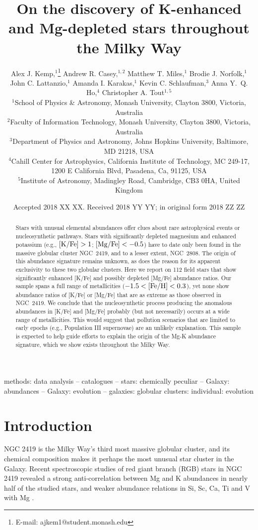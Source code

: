 \documentclass[a4paper,fleqn,usenatbib]{mnras}
\title[Mg-K stars in LAMOST]{On the discovery of K-enhanced and Mg-depleted stars throughout the Milky Way}
\author[Kemp et al.]{Alex J. Kemp,$^{1}$\thanks{E-mail: ajkem1@student.monash.edu}
Andrew R. Casey,$^{1,2}$
Matthew T. Miles,$^{1}$
Brodie J. Norfolk,$^{1}$\newauthor
John C. Lattanzio,$^{1}$
Amanda I. Karakas,$^{1}$
Kevin C. Schlaufman,$^{3}$
Anna Y.~Q. Ho,$^{4}$\newauthor
Christopher A. Tout$^{1,5}$
\\
$^{1}$School of Physics \& Astronomy, Monash University, Clayton 3800, Victoria, Australia\\
$^{2}$Faculty of Information Technology, Monash University, Clayton 3800, Victoria, Australia\\
$^{3}$Department of Physics and Astronomy, Johns Hopkins University, Baltimore, MD 21218, USA\\
$^{4}$Cahill Center for Astrophysics, California Institute of Technology, MC 249-17, 1200 E California Blvd, Pasadena, Ca, 91125, USA\\
$^{5}$Institute of Astronomy, Madingley Road, Cambridge, CB3 0HA, United Kingdom\\
}
\date{Accepted 2018 XX XX. Received 2018 YY YY; in original form 2018 ZZ ZZ}
\begin{document}
\label{firstpage}
\pagerange{\pageref{firstpage}--\pageref{lastpage}}
\maketitle


\begin{abstract}
Stars with unusual elemental abundances offer clues about rare astrophysical events or nucleosynthetic pathways. Stars with significantly depleted magnesium and enhanced potassium (e.g., $[{\rm K}/{\rm Fe}] > 1$; $[{\rm Mg}/{\rm Fe}] < -0.5$) have to date only been found in the massive globular cluster NGC~2419, and to a lesser extent, NGC~2808. The origin of this abundance signature remains unknown, as does the reason for its apparent exclusivity to these two globular clusters. Here we report on 112 field stars that show significantly enhanced [K/Fe] and possibly depleted [Mg/Fe] abundance ratios.
Our sample spans a full range of metallicities ($-1.5 < [{\rm Fe}/{\rm H}] < 0.3$), yet none show abundance ratios of [K/Fe] or [Mg/Fe] that are as extreme as those observed in NGC~2419. 
We conclude that the nucleosynthetic process producing the anomalous abundances in [K/Fe] and [Mg/Fe] probably (but not necessarily) occurs at a wide range of metallicities. This would suggest that pollution scenarios that are limited to early epochs (e.g., Population III supernovae) are an unlikely explanation. This sample is expected to help guide efforts to explain the origin of the Mg-K abundance signature, which we show exists throughout the Milky Way.
\end{abstract}

\begin{keywords}
methods: data analysis -- catalogues -- stars: chemically peculiar -- Galaxy: abundances -- Galaxy: evolution -- galaxies: globular clusters: individual: evolution
\end{keywords}



\section{Introduction}
\label{sec:intro}
NGC 2419 is the Milky Way's third most massive globular cluster, and its chemical composition makes it perhaps the most unusual star cluster in the Galaxy. Recent spectroscopic studies of red giant branch (RGB) stars in NGC 2419 revealed a strong anti-correlation between Mg and K abundances in nearly half of the studied stars, and weaker abundance relations in Si, Sc, Ca, Ti and V with Mg \citep{mucciarelli2012,cohenkirby2012}.
\end{document}
